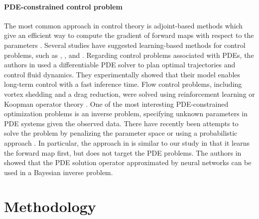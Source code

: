 \documentclass[letterpaper]{article}
\begin{document}
\paragraph{PDE-constrained control problem}
The most common approach in control theory is adjoint-based methods which give an efficient way to compute the gradient of forward maps with respect to the parameters \citep{borrvall2003topology,christofides2002nonlinear,lions1971optimal, mcnamara2004fluid, pironneau1974optimum,troltzsch2010optimal}. Several studies have suggested learning-based methods for control problems, such as \cite{de2018end}, \cite{hafner2019learning}, and \cite{NIPS2015_a1afc58c}. Regarding control problems associated with PDEs, the authors in \cite{holl2020learning} used a differentiable PDE solver to plan optimal trajectories and control fluid dynamics. They experimentally showed that their model enables long-term control with a fast inference time. Flow control problems, including vortex shedding and a drag reduction, were solved using reinforcement learning \cite{rabault2019artificial} or Koopman operator theory \cite{NEURIPS2018_2b0aa0d9}. One of the most interesting PDE-constrained optimization problems is an inverse problem, specifying unknown parameters in PDE systems given the observed data. There have recently been attempts to solve the problem by penalizing the parameter space or using a probabilistic approach \citep{jo2020deep, NEURIPS2019_28f0b864, ma2019probabilistic, pilozzi2018machine, ren2020benchmarking}. In particular, the approach in \cite{ren2020benchmarking} is similar to our study in that it learns the forward map first, but does not target the PDE problems. The authors in \cite{li2020fourier} showed that the PDE solution operator approximated by neural networks can be used in a Bayesian inverse problem.




\section*{Methodology}\label{method}
\end{document}
